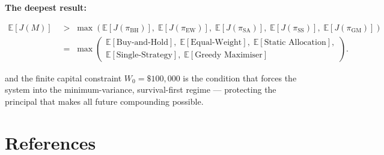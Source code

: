 \documentclass[12pt,openany]{book}
\newcommand{\E}{\mathbb{E}}
\numberwithin{equation}{chapter}
\theoremstyle{plain}
\theoremstyle{definition}
\theoremstyle{remark}
\def\mathcal#1{#1}%
\begin{document}
\medskip
\noindent
\textbf{The deepest result:}

\begin{align}
    \E[J(\mathcal{M})]
    \;&>\;
    \max\!\left(
        \E[J(\pi_{\mathrm{BH}})],\;
        \E[J(\pi_{\mathrm{EW}})],\;
        \E[J(\pi_{\mathrm{SA}})],\;
        \E[J(\pi_{\mathrm{SS}})],\;
        \E[J(\pi_{\mathrm{GM}})]
    \right)
    \nonumber\\[2mm]
    \;&=\;
    \max\!\left(
        \begin{gathered}
        \E[\text{Buy-and-Hold}],\;
        \E[\text{Equal-Weight}],\;
        \E[\text{Static Allocation}],\\
        \E[\text{Single-Strategy}],\;
        \E[\text{Greedy Maximiser}]
        \end{gathered}
    \right).
\end{align}

\noindent
and the finite capital constraint $W_0 = \$100{,}000$ is the
condition that forces the system into the minimum-variance,
survival-first regime --- protecting the principal that makes all
future compounding possible.

\chapter*{References}
\end{document}
